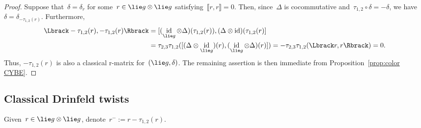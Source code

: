 \documentclass[12pt, reqno]{amsart}
\newcommand{\cybe}[1]{\mathbb{\Lbrack}#1,#1\mathbb{\Rbrack}}
\theoremstyle{definition}
\numberwithin{equation}{section}
\newcommand{\tensor}{\otimes}
\DeclareMathOperator{\id}{id}
\begin{document}
\begin{proof}
Suppose that~$\delta=\delta_{r}$ for some~$r\in\lie g\tensor\lie g$
satisfying~$\cybe{r}=0$.
Then, since~$\Delta$ is cocommutative and~$\tau_{1,2}\circ\delta=-\delta$, we have 
$\delta=\delta_{-\tau_{1,2}(r)}$. Furthermore,
\begin{align*}
\cybe{-\tau_{1,2}(r)}&=[(\id_{\lie g}\tensor\Delta)(\tau_{1,2}(r)),(\Delta\tensor\id)(
\tau_{1,2}(r)]\\
&=\tau_{2,3}\tau_{1,2}([(\Delta\tensor\id_{\lie g})(r),
(\id_{\lie g}\tensor\Delta)(r)])=-\tau_{2,3}\tau_{1,2}(\cybe{r})=0.
\end{align*}
Thus, $-\tau_{1,2}(r)$ is also a classical r-matrix for~$(\lie g,\delta)$.
The remaining assertion is then immediate from Proposition~\ref{prop:color CYBE}.
\end{proof}


\subsection{Classical Drinfeld twists}
Given~$r\in\lie g\tensor \lie g$, denote~$r^-:=r-\tau_{1,2}(r)$.
\end{document}
